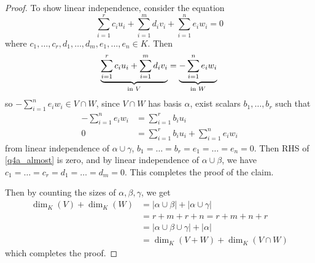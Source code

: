 \documentclass[11pt]{article}
\theoremstyle{definition}
\numberwithin{lemma}{problem}
\numberwithin{equation}{problem}
\begin{document}
\begin{proof}
    \newpage
    To show linear independence, consider the equation
    \begin{equation} \label{q4a_indep}
        \sum_{i=1}^r c_iu_i + \sum_{i=1}^m d_iv_i + \sum_{i=1}^n e_iw_i = 0
    \end{equation}
    where $c_1,\dots,c_r,d_1,\dots,d_m,e_1,\dots,e_n \in K$. Then
    \begin{equation} \label{q4a_almost}
        \underbrace{\sum_{i=1}^r c_iu_i + \sum_{i=1}^m d_iv_i}_{\text{in }V}
        = \underbrace{- \sum_{i=1}^n e_iw_i}_{\text{in }W} \\
    \end{equation}
    so $-\sum_{i=1}^n e_iw_i \in V\cap W$, since $V\cap W$ has basis $\alpha$, exist scalars $b_1,\dots,b_r$ such that
    \begin{align*}
        -\sum_{i=1}^n e_iw_i &= \sum_{i=1}^r b_iu_i  \\
        0 &= \sum_{i=1}^r b_iu_i + \sum_{i=1}^n e_iw_i
    \end{align*}
    from linear independence of $\alpha\cup\gamma$, $b_1 = \dots = b_r = e_1 = \dots = e_n = 0$.
    Then RHS of \eqref{q4a_almost} is zero, and by linear independence of $\alpha\cup\beta$,
    we have $c_1 = \dots = c_r = d_1 = \dots = d_m = 0$.
    This completes the proof of the claim.

    Then by counting the sizes of $\alpha, \beta, \gamma$, we get
    \begin{align*}
        \dim_K(V) + \dim_K(W) &= |\alpha\cup\beta| + |\alpha\cup\gamma| \\
        &= r+m+r+n = r+m+n +r   \\
        &= |\alpha\cup\beta\cup\gamma| + |\alpha|   \\
        &= \dim_K(V+W) + \dim_K(V\cap W)
    \end{align*}
    which completes the proof.
\end{proof}
\end{document}
